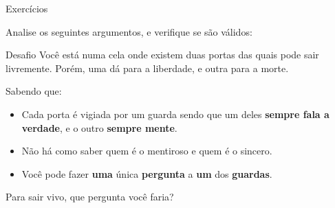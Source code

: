\begin{frame}{Exercícios}\footnotesize

	Analise os seguintes argumentos, e verifique se são válidos:	






\end{frame}

\begin{frame}{Desafio}
Você está numa cela onde existem duas portas das quais pode sair livremente. Porém, uma dá para a liberdade, e outra para a morte. 

Sabendo que: 
\vspace{.5cm}

	\begin{itemize}
		\item Cada porta é vigiada por um guarda sendo que um deles \textbf{sempre fala a verdade}, e o outro \textbf{sempre mente}. 
		\item Não há como saber quem é o mentiroso e quem é o sincero. 
		\item Você pode fazer \textbf{uma }única \textbf{pergunta }a \textbf{um }dos \textbf{guardas}. 
	\end{itemize}

\vspace{.5cm}
Para sair vivo, que pergunta você faria?


\end{frame}

